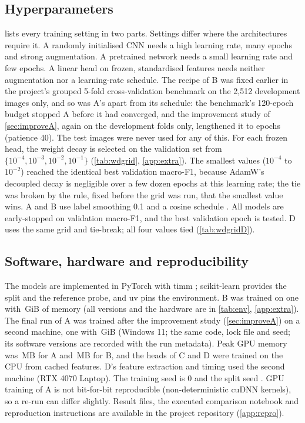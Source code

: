 \documentclass[11pt,a4paper]{article}
\begin{document}
\subsection{Hyperparameters}
 lists every training setting in two parts. Settings differ where the architectures require it. A randomly
initialised CNN needs a high learning rate, many epochs and strong augmentation. A pretrained network needs a small
learning rate and few epochs. A linear head on frozen, standardised features needs neither augmentation nor a
learning-rate schedule. The recipe of B was fixed earlier in the project's grouped 5-fold cross-validation
benchmark on the 2,512 development images only, and so was A's apart from its
schedule: the benchmark's 120-epoch budget stopped A before it had converged, and the improvement study of
\cref{sec:improveA}, again on the development folds only, lengthened it to \maxEpochsA epochs (patience 40). The
\nTest test images were never used for any of this. For each frozen head, the weight decay is selected on the validation set from
$\{10^{-4},10^{-3},10^{-2},10^{-1}\}$ (\cref{tab:wdgrid}, \cref{app:extra}). The \nTies smallest values
($10^{-4}$ to $10^{-2}$) reached the identical best validation macro-F1, because AdamW's decoupled decay \citep{loshchilov2019adamw} is negligible over a
few dozen epochs at this learning rate; the tie was broken by the rule, fixed before the grid was run, that the
smallest value wins. A and B use label smoothing 0.1 \citep{szegedy2016inception} and a cosine schedule
\citep{loshchilov2017sgdr}. All models are early-stopped on validation macro-F1, and the best validation epoch is
tested. D uses the same grid and tie-break; all four values tied (\cref{tab:wdgridD}).



\subsection{Software, hardware and reproducibility}\label{sec:software}
The models are implemented in PyTorch \citep{paszke2019pytorch} with timm \citep{wightman2019timm};
scikit-learn \citep{pedregosa2011sklearn} provides the split and the reference probe, and uv \citep{astral2024uv}
pins the environment. B was trained on one \gpuName with \gpuMem\,GiB of memory (all versions and the hardware are in
\cref{tab:env}, \cref{app:extra}). The final run of A was trained after the improvement study (\cref{sec:improveA})
on a second machine, one \gpuNameA with \gpuMemA\,GiB (Windows 11; the same code, lock file and seed; its software
versions are recorded with the run metadata). Peak GPU memory was
\vramA\,MB for A and \vramB\,MB for B, and the heads of C and D were trained on the CPU from cached features. D's feature extraction and timing used the second machine (RTX 4070 Laptop). The training seed is 0
and the split seed \splitSeed. GPU training of A is not bit-for-bit reproducible (non-deterministic cuDNN kernels), so
a re-run can differ slightly. Result files, the executed comparison notebook and reproduction instructions are available in the project repository
(\cref{app:repro}).
\end{document}
